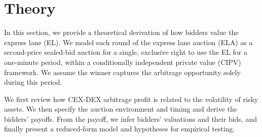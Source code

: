 \section{Theory}\label{sec:theory}
In this section, we provide a theoretical derivation of how bidders value the express lane (EL). We model each round of the express lane auction (ELA) as a second-price sealed-bid auction for a single, exclusive right to use the EL for a one-minute period, within a conditionally independent private value (CIPV) framework. We assume the winner captures the arbitrage opportunity solely during this period.

We first review how CEX-DEX arbitrage profit is related to the volatility of risky assets. We then specify the auction environment and timing and derive the bidders' payoffs. From the payoff, we infer bidders' valuations and their bids, and finally present a reduced-form model and hypotheses for empirical testing.

